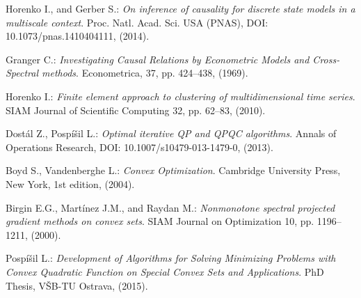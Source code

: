 \documentclass[a4paper,10pt]{article}
\begin{document}
\begin{thebibliography}{}

Horenko I., and Gerber S.:
{\em On inference of causality for discrete state models in a multiscale context}.
Proc. Natl. Acad. Sci. USA (PNAS), DOI: 10.1073/pnas.1410404111, (2014).

Granger C.:
{\em Investigating Causal Relations by Econometric Models and Cross-Spectral methods}.
Econometrica, 37, pp. 424--438, (1969).


Horenko I.:
{\em Finite element approach to clustering of multidimensional time series}.
SIAM Journal of Scientific Computing 32, pp. 62--83, (2010).

 Dost\'{a}l Z., Posp\'{i}\v{s}il L.:
 {\em Optimal iterative QP and QPQC algorithms}.
 Annals of Operations Research, DOI: 10.1007/s10479-013-1479-0, (2013).  

  Boyd S., Vandenberghe L.:
  {\em Convex Optimization}. 
  Cambridge University Press, New York, 1st edition, (2004).

  Birgin E.G., Mart\'{i}nez J.M., and Raydan M.:
  {\em Nonmonotone spectral projected gradient methods on convex sets}.
  SIAM Journal on Optimization 10, pp. 1196--1211, (2000).

 Posp\'{i}\v{s}il L.:
 {\em Development of Algorithms for Solving Minimizing Problems with Convex Quadratic Function on Special Convex Sets and Applications}.
 PhD Thesis, V\v{S}B-TU Ostrava, (2015).


  

   
\end{thebibliography}
\end{document}
